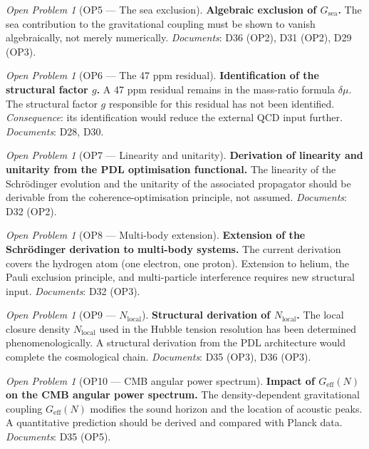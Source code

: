 \documentclass[11pt,a4paper]{article}
\theoremstyle{plain}
\theoremstyle{definition}
\theoremstyle{remark}
\newtheorem{openproblem}[theorem]{Open Problem}
\newcommand{\Geff}{G_{\mathrm{eff}}}
\begin{document}
\begin{openproblem}[OP5 — The sea exclusion]
\label{op:sea}
\textbf{Algebraic exclusion of $G_{\mathrm{sea}}$.}
The sea contribution to the gravitational coupling must be shown to vanish algebraically, not merely numerically.
\emph{Documents}: D36 (OP2), D31 (OP2), D29 (OP3).
\end{openproblem}

\begin{openproblem}[OP6 — The 47 ppm residual]
\label{op:residual}
\textbf{Identification of the structural factor $g$.}
A 47 ppm residual remains in the mass-ratio formula $\delta\mu$.
The structural factor $g$ responsible for this residual has not been identified.
\emph{Consequence}: its identification would reduce the external QCD input further.
\emph{Documents}: D28, D30.
\end{openproblem}

\begin{openproblem}[OP7 — Linearity and unitarity]
\label{op:unitarity}
\textbf{Derivation of linearity and unitarity from the PDL optimisation functional.}
The linearity of the Schr\"odinger evolution and the unitarity of the associated propagator should be derivable from the coherence-optimisation principle, not assumed.
\emph{Documents}: D32 (OP2).
\end{openproblem}

\begin{openproblem}[OP8 — Multi-body extension]
\label{op:multi}
\textbf{Extension of the Schr\"odinger derivation to multi-body systems.}
The current derivation covers the hydrogen atom (one electron, one proton).
Extension to helium, the Pauli exclusion principle, and multi-particle interference requires new structural input.
\emph{Documents}: D32 (OP3).
\end{openproblem}

\begin{openproblem}[OP9 — $N_{\mathrm{local}}$]
\label{op:N_local}
\textbf{Structural derivation of $N_{\mathrm{local}}$.}
The local closure density $N_{\mathrm{local}}$ used in the Hubble tension resolution has been determined phenomenologically.
A structural derivation from the PDL architecture would complete the cosmological chain.
\emph{Documents}: D35 (OP3), D36 (OP3).
\end{openproblem}

\begin{openproblem}[OP10 — CMB angular power spectrum]
\label{op:CMB}
\textbf{Impact of $\Geff(N)$ on the CMB angular power spectrum.}
The density-dependent gravitational coupling $\Geff(N)$ modifies the sound horizon and the location of acoustic peaks.
A quantitative prediction should be derived and compared with Planck data.
\emph{Documents}: D35 (OP5).
\end{openproblem}
\end{document}
